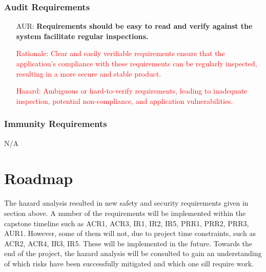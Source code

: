\documentclass{article}
\newcounter{aurreqnum} %
\begin{document}
\subsubsection{Audit Requirements}
\begin{itemize}
    \item[AUR\refstepcounter{aurreqnum}\theaurreqnum \label{R_Inputs}:] \textbf{Requirements should be easy to read and verify against the system facilitate regular inspections.}
    \item[] \textcolor{red}{Rationale: Clear and easily verifiable requirements ensure that the application's compliance with these requirements can be regularly inspected, resulting in a more secure and stable product.}
    \item[] \textcolor{red}{Hazard: Ambiguous or hard-to-verify requirements, leading to inadequate inspection, potential non-compliance, and application vulnerabilities.}
\end{itemize}

\subsubsection{Immunity Requirements}
N/A

\section{Roadmap}

The hazard analysis resulted in new safety and security requirements given in section above. A number of the requirements will be implemented within the capstone timeline such as ACR1, ACR3, IR1, IR2, IR5, PRR1, PRR2, PRR3, AUR1. However, some of them will not, due to project time constraints, such as ACR2, ACR4, IR3, IR5. These will be implemented in the future. Towards the end of the project, the hazard analysis will be consulted to gain an understanding of which risks have been successfully mitigated and which one sill require work.
\end{document}
